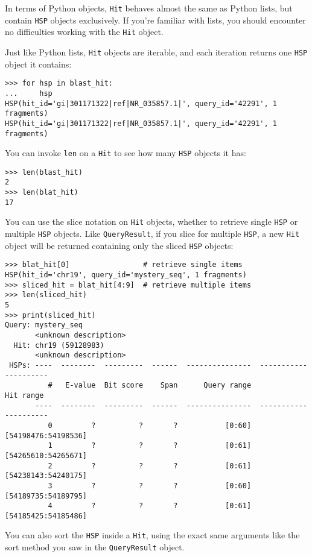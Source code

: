 \documentclass{report}
\begin{document}
In terms of Python objects, \verb|Hit| behaves almost the same as Python lists,
but contain \verb|HSP| objects exclusively. If you're familiar with lists, you
should encounter no difficulties working with the \verb|Hit| object. 

Just like Python lists, \verb|Hit| objects are iterable, and each iteration
returns one \verb|HSP| object it contains:

\begin{verbatim}
>>> for hsp in blast_hit:
...     hsp
HSP(hit_id='gi|301171322|ref|NR_035857.1|', query_id='42291', 1 fragments)
HSP(hit_id='gi|301171322|ref|NR_035857.1|', query_id='42291', 1 fragments)
\end{verbatim}

You can invoke \verb|len| on a \verb|Hit| to see how many \verb|HSP| objects it
has:

\begin{verbatim}
>>> len(blast_hit)
2
>>> len(blat_hit)
17
\end{verbatim}

You can use the slice notation on \verb|Hit| objects, whether to retrieve single
\verb|HSP| or multiple \verb|HSP| objects. Like \verb|QueryResult|, if you slice
for multiple \verb|HSP|, a new \verb|Hit| object will be returned containing
only the sliced \verb|HSP| objects:

\begin{verbatim}
>>> blat_hit[0]                 # retrieve single items
HSP(hit_id='chr19', query_id='mystery_seq', 1 fragments)
>>> sliced_hit = blat_hit[4:9]  # retrieve multiple items
>>> len(sliced_hit)
5
>>> print(sliced_hit)
Query: mystery_seq
       <unknown description>
  Hit: chr19 (59128983)
       <unknown description>
 HSPs: ----  --------  ---------  ------  ---------------  ---------------------
          #   E-value  Bit score    Span      Query range              Hit range
       ----  --------  ---------  ------  ---------------  ---------------------
          0         ?          ?       ?           [0:60]    [54198476:54198536]
          1         ?          ?       ?           [0:61]    [54265610:54265671]
          2         ?          ?       ?           [0:61]    [54238143:54240175]
          3         ?          ?       ?           [0:60]    [54189735:54189795]
          4         ?          ?       ?           [0:61]    [54185425:54185486]
\end{verbatim}

You can also sort the \verb|HSP| inside a \verb|Hit|, using the exact same
arguments like the sort method you saw in the \verb|QueryResult| object.
\end{document}
